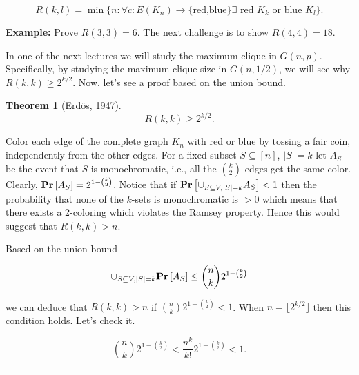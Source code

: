 \documentclass[twoside]{article}
\newcounter{lecnum}
\newtheorem{theorem}{Theorem}[lecnum]
\newenvironment{proof}{{\bf Proof:}}{\hfill\rule{2mm}{2mm}}
\newcommand{\hide}[1]{}
\newcommand{\Prob}[1]{{{\bf{Pr}}\left[{#1}\right]}}
\begin{document}
$$ R(k,l) = \min \{ n: \forall c:E(K_n)\rightarrow \{\text{red,blue}\} \exists \text{~red~} K_k \text{~or blue~} K_l \}.$$ 

{\bf Example:} Prove $R(3,3)=6$. The next challenge is to show $R(4,4)=18$.

\hide{ 
\noindent Let's consider $R(k,k)$. Another perspective of looking at this number is the following. 
Consider $n$ vertices and take any graph $G$ on $[n]$.  Then either $G$ contains a clique of size 
$k$ or its complement an } 

In one of the next lectures we will study the maximum clique in $G(n,p)$. 
Specifically, by studying  the maximum clique size in $G(n,1/2)$,
we will see why $R(k,k) \geq 2^{k/2}$. Now, let's see a proof based 
on the union bound. 

\begin{theorem}[Erd\"os, 1947] 
$$R(k,k) \geq  2^{k/2}.$$
\end{theorem}

\begin{proof}
Color each edge of the complete graph $K_n$ with red or blue by tossing a fair coin, independently
from the other edges. 
For a fixed subset $S \subseteq [n]$, $|S|=k$ let $A_S$ be the event that $S$ is monochromatic,
i.e., all the ${k \choose 2}$ edges get the same color.
Clearly, $ \Prob{A_S} = 2^{1-{k\choose 2}}$.  Notice that 
if $\Prob{ \cup_{S \subseteq V, |S|=k} A_S} <1$ then the probability 
that none of the $k$-sets is monochromatic is $>0$ which means that 
there exists a 2-coloring which violates the Ramsey property. Hence this would 
suggest that $R(k,k)>n$. 

Based on the union bound

$$ \cup_{S \subseteq V, |S|=k} \Prob{A_S} \leq  {n \choose k} 2^{1-{k \choose 2}}$$ 

\noindent we can deduce that $R(k,k)>n$ if ${n \choose k} 2^{1-{k \choose 2}} <1$. 
When $n=\lfloor 2^{k/2} \rfloor$ then this condition holds. Let's check it. 


$$ {n \choose k} 2^{1-{k \choose 2}} < \frac{n^k}{k!} 2^{1-{k \choose 2}} < 1.$$ 

\end{proof}

\end{document}
